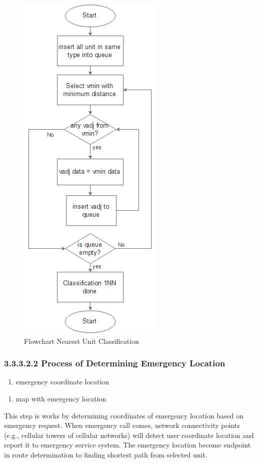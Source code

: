 \begin{figure}[H]
    \centering
    \includegraphics[scale=0.75]{flowchart_classify.jpg}
    \caption{Flowchart Nearest Unit Classification}
    \label{fig:bp_pol}
\end{figure}

\pagebreak
\subsubsection{3.3.3.2.2 Process of Determining Emergency Location}
\begin{enumerate}[label=Input\hspace{5mm} :\hspace{2mm}, leftmargin=*, topsep=0pt, itemsep=-1ex, parsep=1ex]
\item emergency coordinate location
\end{enumerate}
\begin{enumerate}[label=Output\hspace{2mm} :\hspace{2mm}, leftmargin=*, topsep=0pt, itemsep=-1ex, parsep=1ex]
\item map with emergency location
\end{enumerate}
This step is works by determining coordinates of emergency location based on emergency request. When emergency call comes, network connectivity points (e.g., cellular towers of cellular networks) will detect user coordinate location and report it to emergency service system. The emergency location become endpoint in route determination to finding shortest path from selected unit.

